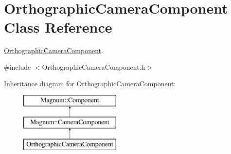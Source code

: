\hypertarget{class_orthographic_camera_component}{}\section{Orthographic\+Camera\+Component Class Reference}
\label{class_orthographic_camera_component}


\hyperlink{class_orthographic_camera_component}{Orthographic\+Camera\+Component}.  




{\ttfamily \#include $<$Orthographic\+Camera\+Component.\+h$>$}

Inheritance diagram for Orthographic\+Camera\+Component\+:\begin{figure}[H]
\begin{center}
\leavevmode
\includegraphics[height=3.000000cm]{class_orthographic_camera_component}
\end{center}
\end{figure}
